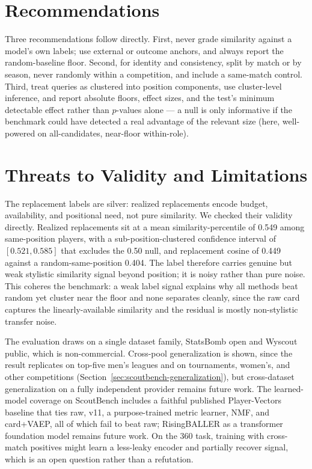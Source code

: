 \section{Recommendations}
\label{sec:recommendations}

Three recommendations follow directly. First, never grade similarity against a
model's own labels; use external or outcome anchors, and always report the
random-baseline floor. Second, for identity and consistency, split by match or
by season, never randomly within a competition, and include a same-match
control. Third, treat queries as clustered into position components, use
cluster-level inference, and report absolute floors, effect sizes, and the
test's minimum detectable effect rather than $p$-values alone --- a null is only
informative if the benchmark could have detected a real advantage of the
relevant size (here, well-powered on all-candidates, near-floor within-role).

\section{Threats to Validity and Limitations}
\label{sec:threats}

The replacement labels are silver: realized replacements encode budget,
availability, and positional need, not pure similarity. We checked their
validity directly. Realized replacements sit at a mean similarity-percentile of
0.549 among same-position players, with a sub-position-clustered confidence
interval of $[0.521, 0.585]$ that excludes the 0.50 null, and replacement
cosine of 0.449 against a random-same-position 0.404. The label therefore
carries genuine but weak stylistic similarity signal beyond position; it is
noisy rather than pure noise. This coheres the benchmark: a weak label signal
explains why all methods beat random yet cluster near the floor and none
separates cleanly, since the raw card captures the linearly-available
similarity and the residual is mostly non-stylistic transfer noise.

The evaluation draws on a single dataset family, StatsBomb open and Wyscout
public, which is non-commercial. Cross-pool generalization is shown, since the
result replicates on top-five men's leagues and on tournaments, women's, and
other competitions (Section~\ref{sec:scoutbench-generalization}), but
cross-dataset generalization on a fully independent provider remains future
work. The learned-model coverage on ScoutBench includes a faithful published
Player-Vectors baseline that ties raw, v11, a purpose-trained metric learner,
NMF, and card+VAEP, all of which fail to beat raw; RisingBALLER as a
transformer foundation model remains future work. On the 360 task, training
with cross-match positives might learn a less-leaky encoder and partially
recover signal, which is an open question rather than a refutation.


